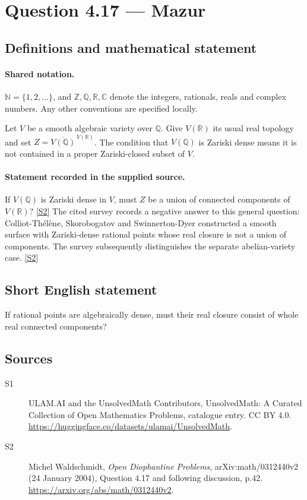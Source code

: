 \documentclass[11pt]{article}
\newcommand{\sref}[2]{\hyperlink{source:#1:#2}{[S#2]}}
\begin{document}
\section{Question 4.17 — Mazur}\label{statement}

\subsection{Definitions and mathematical statement}

\paragraph{Shared notation.}$\mathbb N=\{1,2,\ldots\}$, and $\mathbb Z,\mathbb Q,\mathbb R,\mathbb C$ denote the integers, rationals, reals and complex numbers. Any other conventions are specified locally.


Let $V$ be a smooth algebraic variety over $\mathbb Q$. Give $V(\mathbb R)$ its usual real topology and set $Z=\overline{V(\mathbb Q)}^{\,V(\mathbb R)}$. The condition that $V(\mathbb Q)$ is Zariski dense means it is not contained in a proper Zariski-closed subset of $V$.
\paragraph{Statement recorded in the supplied source.}
If $V(\mathbb Q)$ is Zariski dense in $V$, must $Z$ be a union of connected components of $V(\mathbb R)$? \sref{statement}{2}
The cited survey records a negative answer to this general question: Colliot-Thélène, Skorobogatov and Swinnerton-Dyer constructed a smooth surface with Zariski-dense rational points whose real closure is not a union of components. The survey subsequently distinguishes the separate abelian-variety case. \sref{statement}{2}
\subsection{Short English statement}
If rational points are algebraically dense, must their real closure consist of whole real connected components?
\subsection{Sources}
\begin{description}
\item[\hypertarget{source:statement:1}{S1}] ULAM.AI and the UnsolvedMath Contributors, UnsolvedMath: A Curated Collection of Open Mathematics Problems, catalogue entry. CC BY 4.0. \url{https://huggingface.co/datasets/ulamai/UnsolvedMath}.
\item[\hypertarget{source:statement:2}{S2}] Michel Waldschmidt, \emph{Open Diophantine Problems}, arXiv:math/0312440v2 (24 January 2004), Question 4.17 and following discussion, p.42. \url{https://arxiv.org/abs/math/0312440v2}.
\end{description}
\label{end:statement}
\end{document}
